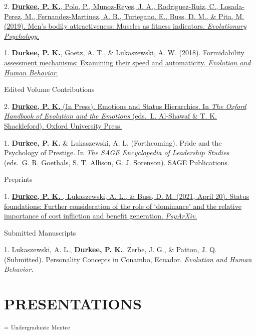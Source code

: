 \documentclass[10pt,]{article}
\begin{document}
2. \hangindent=0.5in
\href{https://journals.sagepub.com/doi/pdf/10.1177/1474704919852918}{\textbf{Durkee,
P. K.}, Polo, P., Munoz-Reyes, J. A., Rodriguez-Ruiz, C., Losada-Perez,
M., Fernandez-Martinez, A. B., Turiegano, E., Buss, D. M., \& Pita, M.
(2019). Men's bodily attractiveness: Muscles as fitness indicators.
\emph{Evolutionary Psychology}.\textsuperscript{\faFileTextO}}

1. \hangindent=0.5in
\href{http://www.pdurkee.com/files/pubs/DurkeeGoetzLukaszewski_2018.pdf}{\textbf{Durkee,
P. K.}\textsuperscript{\faUnsorted}, Goetz, A.
T.\textsuperscript{\faUnsorted}, \& Lukaszewski, A. W. (2018).
Formidability assessment mechanisms: Examining their speed and
automaticity. \emph{Evolution and Human
Behavior}.\textsuperscript{\faFileTextO}}

\textcolor{light-gray}{Edited Volume Contributions}

2. \hangindent=0.5in \href{https://osf.io/hukwr}{\textbf{Durkee, P. K.}
(In Press). Emotions and Status Hierarchies. In \emph{The Oxford
Handbook of Evolution and the Emotions} (eds.~L. Al-Shawaf \& T. K.
Shackleford). Oxford University Press.\textsuperscript{\faFileTextO}}

1. \hangindent=0.5in \textbf{Durkee, P. K.} \& Lukaszewski, A. L.
(Forthcoming). Pride and the Psychology of Prestige. In \emph{The SAGE
Encyclopedia of Leadership Studies} (eds.~G. R. Goethals, S. T. Allison,
G. J. Sorenson). SAGE Publications.

\textcolor{light-gray}{Preprints}

1. \hangindent=0.5in \href{https://psyarxiv.com/4gvt5/}{\textbf{Durkee,
P. K.} , Lukaszewski, A. L., \& Buss, D. M. (2021, April 20). Status
foundations: Further consideration of the role of `dominance' and the
relative importance of cost infliction and benefit generation.
\emph{PsyArXiv}. \textsuperscript{\faFileTextO}}

\textcolor{light-gray}{Submitted Manuscripts}

1. \hangindent=0.5in Lukaszewski, A. L., \textbf{Durkee, P. K.}, Zerbe,
J. G., \& Patton, J. Q. (Submitted). Personality Concepts in Conambo,
Ecuador. \emph{Evolution and Human Behavior}.

\hypertarget{presentations}{%
\section{PRESENTATIONS}\label{presentations}}

\textsuperscript{\faChevronCircleDown} \textsuperscript{=}
\textsuperscript{Undergraduate} \textsuperscript{Mentee}
\end{document}

